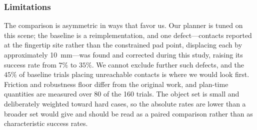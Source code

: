 \subsubsection{Limitations}

The comparison is asymmetric in ways that favor us. Our planner is tuned on this
scene; the baseline is a reimplementation, and one defect---contacts reported at the
fingertip site rather than the constrained pad point, displacing each by
approximately \SI{10}{\milli\meter}---was found and corrected during this study,
raising its success rate from $7\%$ to $35\%$. We cannot exclude further such
defects, and the $45\%$ of baseline trials placing unreachable contacts is where we
would look first. Friction and robustness floor differ from the original work, and
plan-time quantities are measured over 80 of the 160 trials. The object set is small
and deliberately weighted toward hard cases, so the absolute rates are lower than a
broader set would give and should be read as a paired comparison rather than as
characteristic success rates.
